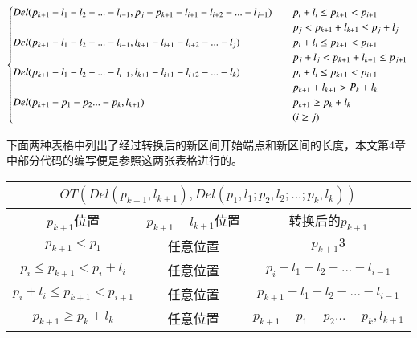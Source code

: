 \begin{equation}
\begin{cases}
Del(p_{k+1}-l_1-l_2-...-l_{i-1},p_j-p_{k+1}-l_{i+1}-l_{i+2}-...-l_{j-1})    \quad &p_i+l_i \le p_{k+1} < p_{i+1} \quad \\& p_j < p_{k+1}+l_{k+1} \le p_j+l_j \\
Del(p_{k+1}-l_1-l_2-...-l_{i-1},l_{k+1}-l_{i+1}-l_{i+2}-...-l_j)    \quad &p_i+l_i \le p_{k+1} < p_{i+1} \quad \\& p_j+l_j < p_{k+1}+l_{k+1} \le p_{j+1} \\
Del(p_{k+1}-l_1-l_2-...-l_{i-1},l_{k+1}-l_{i+1}-l_{i+2}-...-l_k)    \quad &p_i+l_i \le p_{k+1} < p_{i+1} \quad \\& p_{k+1}+l_{k+1} > P_k+l_k  \\
Del(p_{k+1}-p_1-p_2...-p_k,l_{k+1}) \quad &p_{k+1} \ge p_k+l_k
\\&(i \ge j)
 \end{cases}\\
\end{equation}

\par 下面两种表格中列出了经过转换后的新区间开始端点和新区间的长度，本文第4章中部分代码的编写便是参照这两张表格进行的。

\begin{table}[H]
\centering
\begin{tabular}{|c|c|c|} 
\hline
\multicolumn{3}{|c|}{$OT(Del(p_{k+1},l_{k+1}),Del(p_1,l_1;p_2,l_2;...;p_k,l_k))$}\\ 
\hline
$p_{k+1}$位置 &$p_{k+1}+l_{k+1}$位置 &转换后的$p_{k+1}$\\
\hline
$p_{k+1} < p_1$  &任意位置  &$p_{k+1}3$\\ 
\hline
$p_i \le p_{k+1} < p_i+l_i$ &任意位置  &$p_i-l_1-l_2-...-l_{i-1}$\\ 
\hline
$p_i+l_i \le p_{k+1} < p_{i+1}$  &任意位置  &$p_{k+1}-l_1-l_2-...-l_{i-1}$\\ 
\hline
$p_{k+1} \ge p_k+l_k$  &任意位置  &$p_{k+1}-p_1-p_2...-p_k,l_{k+1}$\\ 
\hline
\end{tabular}
\end{table}


